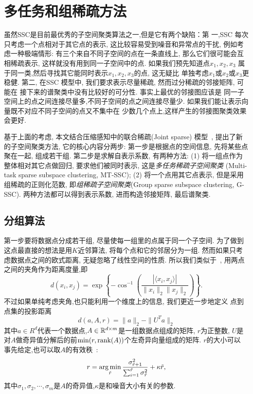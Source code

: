 \chapter{多任务和组稀疏方法}\label{chp:prob_setup}
虽然SSC是目前最优秀的子空间聚类算法之一,但是它有两个缺陷：第
一,SSC 每次只考虑一个点相对于其它点的表示,
这比较容易受到噪音和异常点的干扰, 例如考虑一种极端情形:
有三个来自不同子空间的点在一条直线上, 那么它们很可能会互相稀疏表示,
这样就没有用到同一子空间中的点.
如果我们预先知道点\(x_1, x_2, x_3\)
属于同一类,然后寻找其它能同时表示\(x_1, x_2, x_3\)的点, 这无疑比
单独考虑\(x_1\)或\(x_2\)或\(x_3\)更稳健. 第二, 在SSC 模型中,
我们要求表示尽量稀疏, 然而过分稀疏的邻接矩阵, 可能在
接下来的谱聚类中没有比较好的可分性. 事实上最优的邻接图应该是
同一子空间上的点之间连接尽量多,不同子空间的点之间连接尽量少.
如果我们能让表示向量既不对应不同子空间的点又不集中在
少数几个点上,这样产生的邻接图聚类效果会更好.

基于上面的考虑, 本文结合压缩感知中的联合稀疏(Joint sparse) 模型~\cite{yuan2012visual},
提出了新的子空间聚类方法, 它的核心内容分两步:
第一步是根据点的空间信息, 先将某些点聚在一起, 组成若干组.
第二步是求解自表示系数, 有两种方法:
(1) 将一组点作为整体相对其它点做回归,
要求他们被同时表示, 这是\emph{多任务稀疏子空间聚类}
(Multi-task sparse subspace clustering, MT-SSC);
(2) 将一个点用其它点表示, 但是采用组稀疏的正则化范数,
即\emph{组稀疏子空间聚类}(Group sparse subspace clustering, G-SSC).
两种方法都可以得到表示系数, 进而构造邻接矩阵, 最后谱聚类.

\section{分组算法} 
第一步要将数据点分成若干组, 尽量使每一组里的点属于同一个子空间.
为了做到这点最直接的想法是用\(K\)近邻算法, 将每个点和它的邻居分为一组.
然而如果只考虑数据点之间的欧式距离, 无疑忽略了线性空间的性质.
所以我们类似于~\cite{heckel2013noisy}, 用两点之间的夹角作为距离度量,即
\[d(x_i,x_j)=\exp\left\{-\cos^{-1}\left( \frac{|\langle x_i,
x_j\rangle|}{\|x_i\|_2\|x_j\|_2} \right)\right\}.\]
不过如果单纯考虑夹角,也只能利用一个维度上的信息, 我们更近一步地定义
点到点集的投影距离
\[ d(a, A, r) =  \|a\|_2-\|U^Ta\|_2 \]
其中\(a \in R^d\)代表一个数据点,\(A\in \mathbb{R}^{d\times m}\)是一组数据点组成的矩阵,
\(r\)为正整数, \(U\)是对\(A\)做奇异值分解后的前\(\min(r, \operatorname{rank}(A))\)个左奇异向量组成的矩阵.
\(r\)的大小可以
事先给定,也可以取\(A\)的有效秩~\cite{yan2006general}:
\[
  r = \operatorname*{arg\,min}_{\tilde{r}} \frac{\sigma_{\tilde{r}+1}^2}{\sum_{i=1}^{\tilde{r}}
  \sigma_{\tilde{r}}^2} +\kappa \tilde{r},
\]
其中\(\sigma_1,\sigma_2,\cdots,\sigma_m\)是\(A\)的奇异值,\(\kappa\)是和噪音大小有关的参数.

